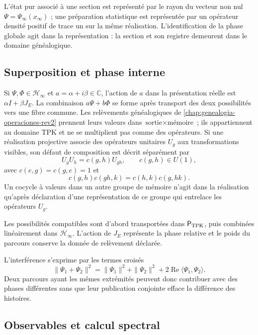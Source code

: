 \begin{principle}
L’état pur associé à une section est représenté par le rayon du vecteur non nul \(\Psi=\Psi_\infty(x_\infty)\) ; une préparation statistique est représentée par un opérateur densité positif de trace un sur la même réalisation. L’identification de la phase globale agit dans la représentation : la section et son registre demeurent dans le domaine généalogique.
\end{principle}

\subsection{Superposition et phase interne}

Si \(\Psi,\Phi\in\mathcal H_\infty\) et \(a=\alpha+i\beta\in\mathbb C\), l’action de \(a\) dans la présentation réelle est \(\alpha I+\beta J_E\). La combinaison \(a\Psi+b\Phi\) se forme après transport des deux possibilités vers une fibre commune. Les relèvements généalogiques de \cref{chap:genealogia-operaciones-rev2} prennent leurs valeurs dans \(\text{sortie}\times\text{mémoire}\) ; ils appartiennent au domaine TPK et ne se multiplient pas comme des opérateurs. Si une réalisation projective associe des opérateurs unitaires \(U_g\) aux transformations visibles, son défaut de composition est décrit séparément par
\[
 U_gU_h=c(g,h)U_{gh},
 \qquad c(g,h)\in U(1),
\]
avec \(c(e,g)=c(g,e)=1\) et
\[
 c(g,h)c(gh,k)=c(h,k)c(g,hk).
\]
Un cocycle à valeurs dans un autre groupe de mémoire n’agit dans la réalisation qu’après déclaration d’une représentation de ce groupe qui entrelace les opérateurs \(U_g\).

\begin{principle}
Les possibilités compatibles sont d’abord transportées dans \(\mathsf P_{\rm TPK}\), puis combinées linéairement dans \(\mathcal H_\infty\). L’action de \(J_E\) représente la phase relative et le poids du parcours conserve la donnée de relèvement déclarée.
\end{principle}

L’interférence s’exprime par les termes croisés
\[
 \|\Psi_1+\Psi_2\|^2
 =\|\Psi_1\|^2+\|\Psi_2\|^2
  +2\operatorname{Re}\langle\Psi_1,\Psi_2\rangle.
\]
Deux parcours ayant les mêmes extrémités peuvent donc contribuer avec des phases différentes sans que leur publication conjointe efface la différence des histoires.

\subsection{Observables et calcul spectral}

